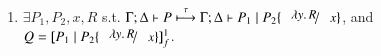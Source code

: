 \begin{proposition}
\begin{enumerate}[1.]
\begin{enumerate}[a)]
\begin{enumerate}[-]
			\item $\exists P_1, P_2, x, R$ s.t. 
			$\stytra{ \Gamma }{\tau}{ \Delta }{ P}{ \Delta}{ P_1 \Par P_2\subst{\abs{y}R}{x} }$, and 
			$Q = \map{P_1 \Par P_2\subst{\abs{y}R}{x}}^{1}_f$.

			\end{enumerate}
		    \end{enumerate}
		    
	\end{enumerate}
\end{proposition}

